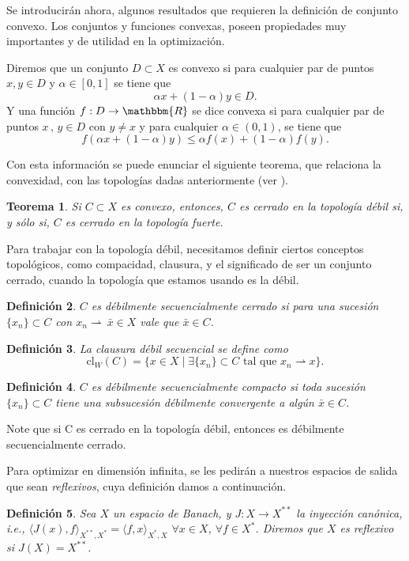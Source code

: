 \documentclass[a4paper,10pt]{book}
\newcommand{\R}{\mathbbm{R}}
\newcommand{\arr}{\rightarrow}
\newcommand{\bx}{\bar{x}}
\newcommand{\la}{\langle}
\newcommand{\ra}{\rangle}
\newcommand{\deb}{\rightharpoonup}
\newtheorem{teo}{Teorema}%
\newtheorem{defi}[teo]{Definici\'on}
\begin{document}
Se introducirán ahora, algunos resultados que requieren la definición de conjunto convexo.
Los conjuntos y funciones convexas, poseen propiedades muy importantes y de utilidad en la optimización.

Diremos que un conjunto $D\subset X$ es convexo si para cualquier par de puntos $x,y\in D$ y $\alpha\in[0,1]$ se tiene que $$\alpha x + (1-\alpha)y\in D.$$
Y una función $f:D\arr\R$ se dice convexa si para cualquier par de puntos $x\, ,\,y\in D$ con $y\neq x$ y para cualquier $\alpha\in (0,1)$, se tiene que $$f(\alpha x+(1-\alpha)y)\leq\alpha f(x)+(1-\alpha)f(y).$$

Con esta información se puede enunciar el siguiente teorema, que relaciona la convexidad, con las topologías dadas anteriormente (ver \cite[Theorem 3.7.]{brezis2010functional}).

\begin{teo}
Si $C\subset X$ es convexo, entonces, $C$ es cerrado en la topología débil si, y sólo si, $C$ es cerrado en la topología fuerte.
\end{teo}

Para trabajar con la topología débil, necesitamos definir ciertos conceptos topológicos, como compacidad, clausura, y el significado de ser un conjunto cerrado, cuando la topología que estamos usando es la débil.

\begin{defi}
 $C$ es débilmente secuencialmente cerrado si para una sucesión $\{x_n\}\subset C$ con $x_n\deb~\bx\in X$ vale que $\bx\in C$.
\end{defi}
\begin{defi}
 La clausura débil secuencial se define como
 \[
\mathrm{cl}_W(C)=\{x\in X\mid \exists\{x_n\}\subset C\mbox{ tal que }x_n\deb x\}.  
 \]

\end{defi}
\begin{defi}
 $C$ es débilmente secuencialmente compacto si toda sucesión $\{x_n\}\subset C$ tiene una subsucesión débilmente convergente a algún $\bx\in C$.
\end{defi}

Note que si C es cerrado en la topología débil, entonces es débilmente secuencialmente cerrado.

Para optimizar en dimensión infinita, se les pedirán a nuestros espacios de salida que sean \emph{reflexivos}, cuya definición damos a continuación.

\begin{defi}
 Sea $X$ un espacio de Banach, y $J:X\arr X^{**}$ la inyección canónica, i.e., $\la J(x),f\ra_{X^{**},X^*}=\la f,x\ra_{X^*,X}$ $\forall x\in X$, $\forall f\in X^*$. Diremos que $X$ es reflexivo si $J(X)=X^{**}$.
\end{defi}
\end{document}
